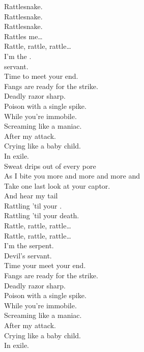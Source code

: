 Rattlesnake. \\
Rattlesnake. \\
Rattlesnake. \\
Rattles me… \\

Rattle, rattle, rattle… \\

I'm the . \\
 servant. \\
Time to meet your end. \\

Fangs are ready for the strike. \\
Deadly razor sharp. \\
Poison with a single spike. \\
While you're immobile. \\

Screaming like a maniac. \\
After my attack. \\
Crying like a baby child. \\
In exile. \\

Sweat drips out of every pore \\
As I bite you more and more and more and \\
Take one last look at your captor. \\
And hear my tail \\
Rattling 'til your . \\

Rattling 'til your death. \\

Rattle, rattle, rattle… \\

Rattle, rattle, rattle… \\

I'm the serpent. \\
Devil's servant. \\
Time your meet your end. \\

Fangs are ready for the strike. \\
Deadly razor sharp. \\
Poison with a single spike. \\
While you're immobile. \\

Screaming like a maniac. \\
After my attack. \\
Crying like a baby child. \\
In exile. \\

